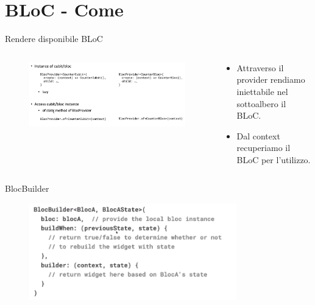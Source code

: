 \documentclass{../libs/presentation_format}
\begin{document}
\section{BLoC - Come}
\begin{frame}{Rendere disponibile BLoC}
	\begin{minipage}[0.2\textheight]{\textwidth}
		\begin{columns}[T]
			\begin{column}{0.4\textwidth}
				\begin{figure}[htpb]
					\centering
					\includegraphics[scale=0.15]{../libs/bloc-provider}
				\end{figure}
			\end{column}
			\begin{column}{0.6\textwidth}
				\begin{itemize}
					\item Attraverso il provider rendiamo iniettabile nel sottoalbero il BLoC.
					\item Dal context recuperiamo il BLoC per l'utilizzo.
				\end{itemize}
			\end{column}
		\end{columns}
	\end{minipage}
\end{frame}


\begin{frame}{BlocBuilder}
	\begin{figure}[htpb]
		\centering
		\includegraphics[width=9cm]{../libs/bloc-builder}
	\end{figure}
\end{frame}
\end{document}
